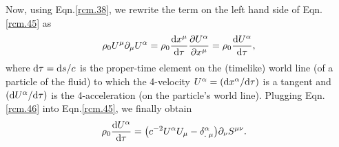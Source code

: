 Now, using Eqn.\eqref{rcm.38}, we rewrite the term on the 
left hand side of Eqn.\eqref{rcm.45} as
\begin{align} \label{rcm.46}
\rho_0 U^{{\mu}}{\partial}_{{\mu}} U^{{\alpha}}
=\rho_0 \frac{\mathrm{d} x^{{\mu}}}{\mathrm{d} {\tau}}
\frac{ {\partial} U^{{\alpha}}}{{\partial} x^{{\mu}}}
=\rho_0 \frac{ \mathrm{d} U^{{\alpha}}}{\mathrm{d} {\tau}},
\end{align}
where $\mathrm{d} {\tau}=\mathrm{d} s/c$ is the proper-time element on  
the  (timelike) world line (of a particle of the fluid) 
to which the 4-velocity $U^{{\alpha}}=(\mathrm{d} x^{{\alpha}}/\mathrm{d} {\tau})$ is a 
tangent and $(\mathrm{d} U^{{\alpha}}/\mathrm{d} {\tau})$ is the 4-acceleration 
(on the particle's world line).  Plugging  
Eqn.\eqref{rcm.46} into Eqn.\eqref{rcm.45}, we finally 
obtain
\begin{align} \label{rcm.47}
\rho_0 \frac{\mathrm{d} U^{{\alpha}}}{\mathrm{d} {\tau}}
&=\big(c^{-2}U^{{\alpha}}
U_{{\mu}}-{{{\delta}}^{{\alpha}}_{.\;{\mu}}}
\big){\partial}_{{\nu}} S^{{\mu}{\nu}}.
\end{align}

